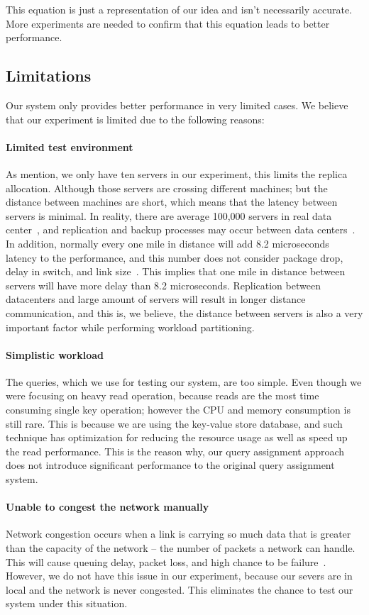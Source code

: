 This equation is just a representation of our idea and isn't necessarily accurate. More experiments are needed to confirm that this equation leads to better performance. 

\subsection{Limitations}
Our system only provides better performance in very limited cases. We believe that our experiment is limited due to the following reasons:

\paragraph{Limited test environment}
As mention, we only have ten servers in our experiment, this limits the replica allocation. Although those servers are crossing different machines; but the distance between machines are short, which means that the latency between servers is minimal. In reality, there are average 100,000 servers in real data center~\cite{Guo:2010:SDC:1921168.1921188}, and replication and backup processes may occur between data centers~\cite{F5-Accelerate}. In addition, normally every one mile in distance will add 8.2 microseconds latency to the performance, and this number does not consider package drop, delay in switch, and link size~\cite{Cisco-Latency}. This implies that one mile in distance between servers will have more delay than 8.2 microseconds. Replication between datacenters and large amount of servers will result in longer distance communication, and this is, we believe, the distance between servers is also a very important factor while performing workload partitioning.
 
\paragraph{Simplistic workload}
The queries, which we use for testing our system, are too simple. Even though we were focusing on heavy read operation, because reads are the most time consuming single key operation; however the CPU and memory consumption is still rare. This is because we are using the key-value store database, and such technique has optimization for reducing the resource usage as well as speed up the read performance. This is the reason why, our query assignment approach does not introduce significant performance to the original query assignment system.
 
\paragraph{Unable to congest the network manually}
Network congestion occurs when a link is carrying so much data that is greater than the capacity of the network – the number of packets a network can handle. This will cause queuing delay, packet loss, and high chance to be failure~\cite{103559}. However, we do not have this issue in our experiment, because our severs are in local and the network is never congested. This eliminates the chance to test our system under this situation.
 
